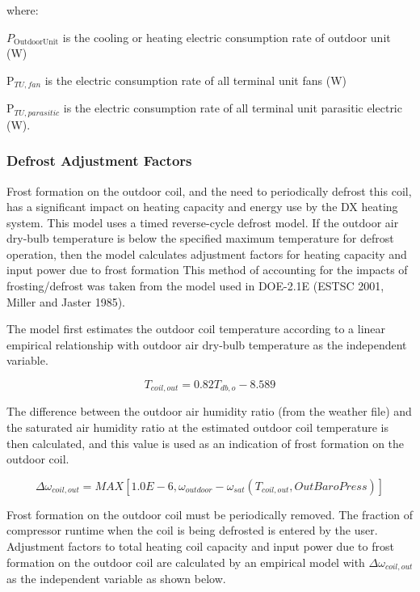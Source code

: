 where:

$P_{\mathrm{OutdoorUnit}}$ is the cooling or heating electric consumption rate of outdoor unit (W)

P\(_{TU,fan}\) is the electric consumption rate of all terminal unit fans (W)

P\(_{TU,parasitic}\) is the electric consumption rate of all terminal unit parasitic electric (W).

\subsubsection{Defrost Adjustment Factors}\label{defrost-adjustment-factors}

Frost formation on the outdoor coil, and the need to periodically defrost this coil, has a significant impact on heating capacity and energy use by the DX heating system. This model uses a timed reverse-cycle defrost model. If the outdoor air dry-bulb temperature is below the specified maximum temperature for defrost operation, then the model calculates adjustment factors for heating capacity and input power due to frost formation This method of accounting for the impacts of frosting/defrost was taken from the model used in DOE-2.1E (ESTSC 2001, Miller and Jaster 1985).

The model first estimates the outdoor coil temperature according to a linear empirical relationship with outdoor air dry-bulb temperature as the independent variable.

\begin{equation}
  T_{coil,out} = 0.82 T_{db,o} - 8.589
\end{equation}

The difference between the outdoor air humidity ratio (from the weather file) and the saturated air humidity ratio at the estimated outdoor coil temperature is then calculated, and this value is used as an indication of frost formation on the outdoor coil.

\begin{equation}
  \Delta \omega_{coil,out} = MAX \left[ 1.0E - 6, \omega_{outdoor} - \omega_{sat} \left( T_{coil,out},OutBaroPress \right) \right]
\end{equation}

Frost formation on the outdoor coil must be periodically removed. The fraction of compressor runtime when the coil is being defrosted is entered by the user. Adjustment factors to total heating coil capacity and input power due to frost formation on the outdoor coil are calculated by an empirical model with \(\Delta \omega_{coil,out}\) as the independent variable as shown below.


